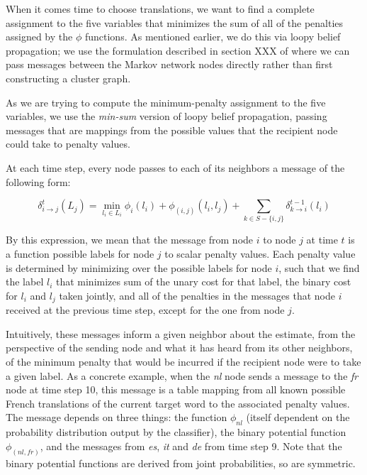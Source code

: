 \documentclass[11pt,letterpaper]{article}
\begin{document}
When it comes time to choose translations, we want to find a complete
assignment to the five variables that minimizes the sum of all of the penalties
assigned by the $\phi$ functions. As mentioned earlier, we do this via loopy
belief propagation; we use the formulation described in section XXX of
\cite{Koller+Friedman:09} where we can pass messages between the Markov network
nodes directly rather than first constructing a cluster graph.

As we are trying to compute the minimum-penalty assignment to the five
variables, we use the \emph{min-sum} version of loopy belief propagation,
passing messages that are mappings from the possible values that the recipient
node could take to penalty values.

At each time step, every node passes to each of its neighbors a message of the
following form:

\begin{dmath}
\delta_{i \rightarrow j}^{t} (L_j) =
  \min_{l_i \in L_i}
  \phi_i(l_i) +
  \phi_{(i,j)}(l_i, l_j) +
  \sum_{k \in S - \lbrace i,j \rbrace}
  \delta_{k \rightarrow i}^{t-1} (l_i)
\end{dmath}

By this expression, we mean that the message from node $i$ to node $j$ at time
$t$ is a function possible labels for node $j$ to scalar penalty values. Each
penalty value is determined by minimizing over the possible labels for node
$i$, such that we find the label $l_i$ that minimizes sum of the unary cost for
that label, the binary cost for $l_i$ and $l_j$ taken jointly, and all of the
penalties in the messages that node $i$ received at the previous time step,
except for the one from node $j$.

Intuitively, these messages inform a given neighbor about the estimate, from
the perspective of the sending node and what it has heard from its other
neighbors, of the minimum penalty that would be incurred if the recipient node
were to take a given label. As a concrete example, when the \emph{nl} node
sends a message to the \emph{fr} node at time step 10, this message is a table
mapping from all known possible French translations of the current target word
to the associated penalty values. The message depends on three things: the
function $\phi_{nl}$ (itself dependent on the probability distribution output
by the classifier), the binary potential function $\phi_{(nl,fr)}$, and the
messages from \emph{es}, \emph{it} and \emph{de} from time step 9.  Note that
the binary potential functions are derived from joint probabilities, so are
symmetric.
\end{document}
